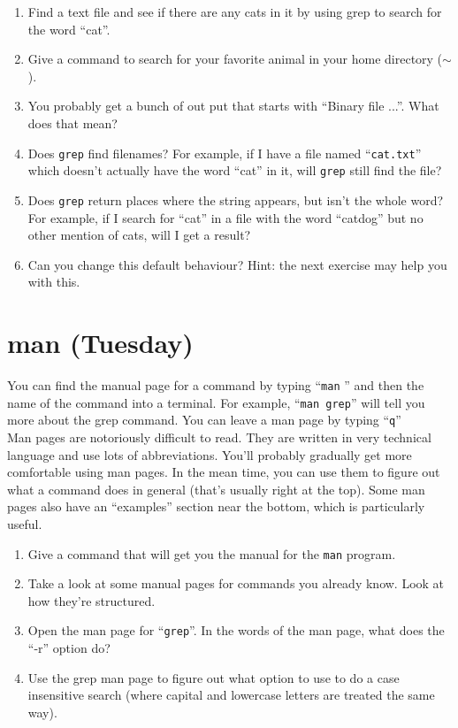 \documentclass{article}
\begin{document}
\begin{enumerate}[a]
\item Find a text file and see if there are any cats in it by using grep to search for the word ``cat''.
\item Give a command to search for your favorite animal in your home directory ($\sim$).
\item You probably get a bunch of out put that starts with ``Binary file ...''.  What does that mean? 
\item Does \texttt{grep} find filenames?  For example, if I have a file named ``\texttt{cat.txt}'' which doesn't actually have the word ``cat'' in it, will \texttt{grep} still find the file?
\item Does \texttt{grep} return places where the string appears, but isn't the whole word?  For example, if I search for ``cat'' in a file with the word ``catdog'' but no other mention of cats, will I get a result?
\item Can you change this default behaviour?  Hint:  the next exercise may help you with this.
\end{enumerate}


\section{man (Tuesday)}
You can find the manual page for a command by typing ``\texttt{man} '' and then the name of the command into a terminal.  For example, ``\texttt{man grep}'' will tell you more about the grep command.  You can leave a man page by typing ``\texttt{q}''\\

Man pages are notoriously difficult to read.  They are written in very technical language and use lots of abbreviations.  You'll probably gradually get more comfortable using man pages.  In the mean time, you can use them to figure out what a command does in general (that's usually right at the top).  Some man pages also have an ``examples'' section near the bottom, which is particularly useful.

\begin{enumerate}[a]
\item Give a command that will get you the manual for the \texttt{man} program.
\item Take a look at some manual pages for commands you already know.  Look at how they're structured.
\item Open the man page for ``\texttt{grep}''.  In the words of the man page, what does the ``-r'' option do?
\item Use the grep man page to figure out what option to use to do a case insensitive search (where capital and lowercase letters are treated the same way). 
\end{enumerate}
\end{document}
